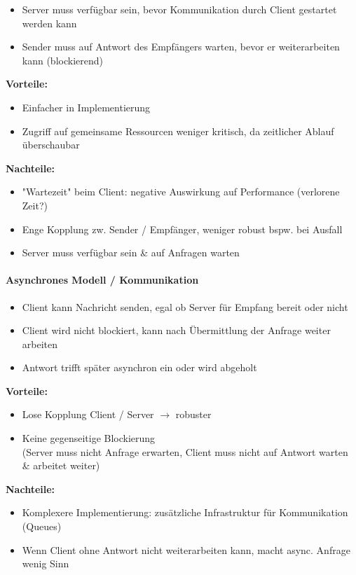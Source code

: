 \documentclass[a4paper]{article}
\begin{document}
					\begin{itemize}
						\item Server muss verfügbar sein, bevor Kommunikation durch Client gestartet werden kann
						\item Sender muss auf Antwort des Empfängers warten, bevor er weiterarbeiten kann (blockierend)
					\end{itemize}
					\textbf{Vorteile:}
					\begin{itemize}
						\item Einfacher in Implementierung
						\item Zugriff auf gemeinsame Ressourcen weniger kritisch, da zeitlicher Ablauf überschaubar
					\end{itemize}
					\textbf{Nachteile:}
					\begin{itemize}
						\item "Wartezeit" beim Client: negative Auswirkung auf Performance (verlorene Zeit?)
						\item Enge Kopplung zw. Sender / Empfänger, weniger robust bspw. bei Ausfall
						\item Server muss verfügbar sein \& auf Anfragen warten
					\end{itemize}
			
				\paragraph{Asynchrones Modell / Kommunikation}
				
					\begin{itemize}
						\item Client kann Nachricht senden, egal ob Server für Empfang bereit oder nicht
						\item Client wird nicht blockiert, kann nach Übermittlung der Anfrage weiter arbeiten
						\item Antwort trifft später asynchron ein oder wird abgeholt
					\end{itemize}
					\textbf{Vorteile:}
					\begin{itemize}
						\item Lose Kopplung Client / Server $\rightarrow$ robuster
						\item Keine gegenseitige Blockierung \\
						(Server muss nicht Anfrage erwarten, Client muss nicht auf Antwort warten \& arbeitet weiter)
					\end{itemize}
					\textbf{Nachteile:}
					\begin{itemize}
						\item Komplexere Implementierung: zusätzliche Infrastruktur für Kommunikation (Queues)
						\item Wenn Client ohne Antwort nicht weiterarbeiten kann, macht async. Anfrage wenig Sinn
					\end{itemize}
				
\end{document}
